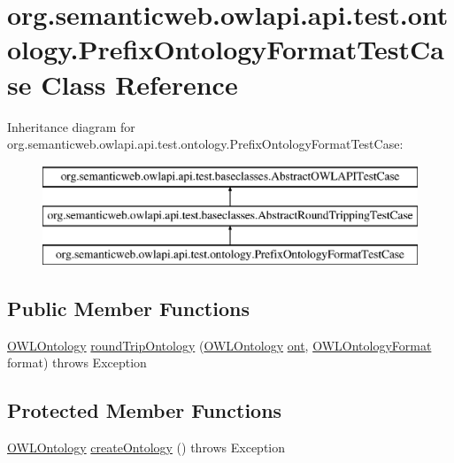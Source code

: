 \hypertarget{classorg_1_1semanticweb_1_1owlapi_1_1api_1_1test_1_1ontology_1_1_prefix_ontology_format_test_case}{\section{org.\-semanticweb.\-owlapi.\-api.\-test.\-ontology.\-Prefix\-Ontology\-Format\-Test\-Case Class Reference}
\label{classorg_1_1semanticweb_1_1owlapi_1_1api_1_1test_1_1ontology_1_1_prefix_ontology_format_test_case}
}
Inheritance diagram for org.\-semanticweb.\-owlapi.\-api.\-test.\-ontology.\-Prefix\-Ontology\-Format\-Test\-Case\-:\begin{figure}[H]
\begin{center}
\leavevmode
\includegraphics[height=3.000000cm]{classorg_1_1semanticweb_1_1owlapi_1_1api_1_1test_1_1ontology_1_1_prefix_ontology_format_test_case}
\end{center}
\end{figure}
\subsection*{Public Member Functions}
\begin{DoxyCompactItemize}
\item 
\hyperlink{interfaceorg_1_1semanticweb_1_1owlapi_1_1model_1_1_o_w_l_ontology}{O\-W\-L\-Ontology} \hyperlink{classorg_1_1semanticweb_1_1owlapi_1_1api_1_1test_1_1ontology_1_1_prefix_ontology_format_test_case_abf94c4d1bb7cb5a12a0798f3581a032f}{round\-Trip\-Ontology} (\hyperlink{interfaceorg_1_1semanticweb_1_1owlapi_1_1model_1_1_o_w_l_ontology}{O\-W\-L\-Ontology} \hyperlink{classorg_1_1semanticweb_1_1owlapi_1_1api_1_1test_1_1baseclasses_1_1_abstract_round_tripping_test_case_aa3cd8b4bfda1074c9cb4aea4680c5611}{ont}, \hyperlink{classorg_1_1semanticweb_1_1owlapi_1_1model_1_1_o_w_l_ontology_format}{O\-W\-L\-Ontology\-Format} format)  throws Exception 
\end{DoxyCompactItemize}
\subsection*{Protected Member Functions}
\begin{DoxyCompactItemize}
\item 
\hyperlink{interfaceorg_1_1semanticweb_1_1owlapi_1_1model_1_1_o_w_l_ontology}{O\-W\-L\-Ontology} \hyperlink{classorg_1_1semanticweb_1_1owlapi_1_1api_1_1test_1_1ontology_1_1_prefix_ontology_format_test_case_a3e05ef7d03b2066e66b8770950e06ff0}{create\-Ontology} ()  throws Exception 
\end{DoxyCompactItemize}


